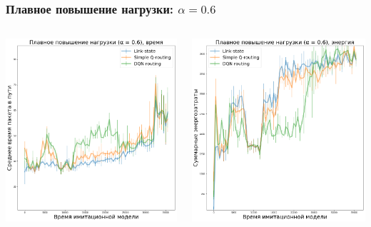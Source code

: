 \documentclass{beamer}
\begin{document}

\begin{frame}
  \frametitle{Плавное повышение нагрузки: $\alpha = 0.6$}
  \begin{columns}
    \begin{column}{0.5\textwidth}
      \includegraphics[width=\textwidth]{experiment-conveyors-a06-time-tall}
    \end{column}
    \begin{column}{0.5\textwidth}
      \includegraphics[width=\textwidth]{experiment-conveyors-a06-energy-tall}

\end{column}
\end{columns}
\end{frame}
\end{document}
